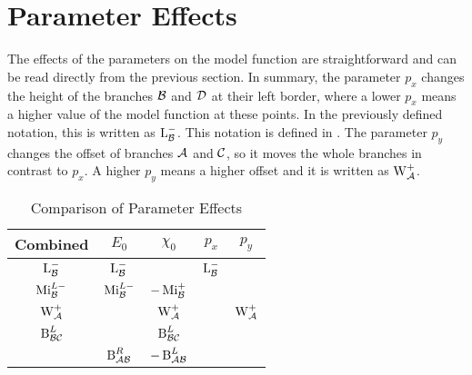 \section{Parameter Effects}

The effects of the parameters on the model function are straightforward and can be read directly from the previous section.
In summary, the parameter $p_x$ changes the height of the branches $\mathcal{B}$ and $\mathcal{D}$ at their left border, where a lower $p_x$ means a higher value of the model function at these points.
In the previously defined notation, this is written as $\operatorname{L}_{\mathcal{B}}^-$.
This notation is defined in .
The parameter $p_y$ changes the offset of branches $\mathcal{A}$ and $\mathcal{C}$, so it moves the whole branches in contrast to $p_x$.
A higher $p_y$ means a higher offset and it is written as $\operatorname{W}_{\mathcal{A}}^+$.



\begin{table}
    \centering
    \begin{tabular}{|c||c|c||c|c|} \hline
        Combined         & $E_0$            & $\chi_0$          & $p_x$        & $p_y$          \\ \hline \hline
        $\operatorname{L}_{\mathcal{B}}^{-}$   & $\operatorname{L}_{\mathcal{B}}^{-}$   &                   & $\operatorname{L}_{\mathcal{B}}^-$ &                \\ \hline
        $\operatorname{Mi}_{\mathcal{B}}^{L-}$ & $\operatorname{Mi}_{\mathcal{B}}^{L-}$ & $-\operatorname{Mi}_{\mathcal{B}}^{+}$  &              &                \\ \hline
        $\operatorname{W}_{\mathcal{A}}^{+}$   &                  & $\operatorname{W}_{\mathcal{A}}^{+}$    &              & $\operatorname{W}_{\mathcal{A}}^{+}$ \\ \hline \hline
        $\operatorname{B}_{\mathcal{B}\mathcal{C}}^{L}$ &                  & $\operatorname{B}_{\mathcal{B}\mathcal{C}}^{L}$  &              &                \\ \hline
                         & $\operatorname{B}_{\mathcal{A}\mathcal{B}}^{R}$ & $-\operatorname{B}_{\mathcal{A}\mathcal{B}}^{L}$ &              &                \\ \hline
    \end{tabular}
    \caption{Comparison of Parameter Effects}
    \label{tab:final.def.parameters.effects}
\end{table}

